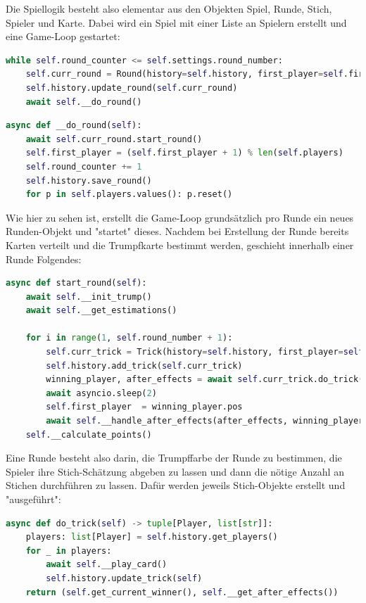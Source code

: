 Die Spiellogik besteht also elementar aus den Objekten Spiel, Runde, Stich, Spieler und Karte. Dabei wird ein Spiel mit einer Liste an Spielern erstellt und eine Game-Loop gestartet:

\begin{lstlisting}[language=Python]
while self.round_counter <= self.settings.round_number:
	self.curr_round = Round(history=self.history, first_player=self.first_player, round_counter=self.round_counter)
	self.history.update_round(self.curr_round)
	await self.__do_round()
\end{lstlisting}

\begin{lstlisting}[language=Python]
async def __do_round(self):
	await self.curr_round.start_round()
	self.first_player = (self.first_player + 1) % len(self.players)
	self.round_counter += 1
	self.history.save_round()
	for p in self.players.values(): p.reset()
\end{lstlisting}

Wie hier zu sehen ist, erstellt die Game-Loop grundsätzlich pro Runde ein neues Runden-Objekt und "startet" dieses. Nachdem bei Erstellung der Runde bereits Karten verteilt und die Trumpfkarte bestimmt werden, geschieht innerhalb einer Runde Folgendes:

\begin{lstlisting}[language=Python]
async def start_round(self):
	await self.__init_trump()
	await self.__get_estimations()
	
	for i in range(1, self.round_number + 1):
		self.curr_trick = Trick(history=self.history, first_player=self.first_player, trick_number=i, trump_color=self.trump_color)
		self.history.add_trick(self.curr_trick)
		winning_player, after_effects = await self.curr_trick.do_trick()
		await asyncio.sleep(2)
		self.first_player  = winning_player.pos
		await self.__handle_after_effects(after_effects, winning_player, i)
	self.__calculate_points()
\end{lstlisting}

Eine Runde besteht also darin, die Trumpffarbe der Runde zu bestimmen, die Spieler ihre Stich-Schätzung abgeben zu lassen und dann die nötige Anzahl an Stichen durchführen zu lassen. Dafür werden jeweils Stich-Objekte erstellt und "ausgeführt":

\begin{lstlisting}[language=Python]
async def do_trick(self) -> tuple[Player, list[str]]:
	players: list[Player] = self.history.get_players()
	for _ in players:
		await self.__play_card()
		self.history.update_trick(self)
	return (self.get_current_winner(), self.__get_after_effects())
\end{lstlisting}

